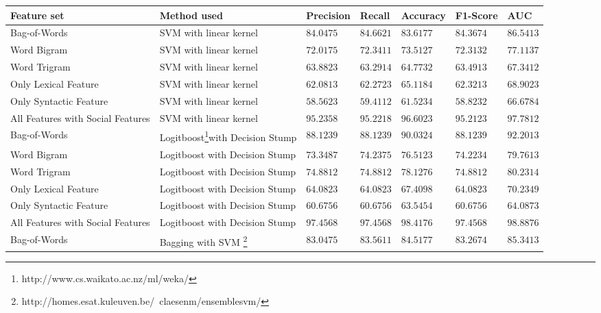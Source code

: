 \begin{table*}[htb]
  \centering
  {\small
  \begin{tabular}{|@{~}l@{~~}|@{~~}l@{~}|@{~~}l@{~}|@{~~}l@{~}|@{~~}l@{~}|@{~~}l@{~}|@{~~}l@{~}|}
\hline
Feature set & Method used & Precision & Recall & Accuracy & F1-Score & AUC \\\hline
Bag-of-Words & SVM with linear kernel & $84.0475$ & $84.6621$ & $83.6177$ & $84.3674$ & $86.5413$ \\\hline
Word Bigram & SVM with linear kernel & $72.0175$ & $72.3411$ & $73.5127$ & $72.3132$ & $77.1137$  \\\hline
Word Trigram & SVM with linear kernel & $63.8823$ & $63.2914$ & $64.7732$ & $63.4913$  & $67.3412$  \\\hline
Only Lexical Feature & SVM with linear kernel & $62.0813$ & $62.2723$ & $65.1184$ & $62.3213$   & $68.9023$ \\\hline
Only Syntactic Feature & SVM with linear kernel & $58.5623$ & $59.4112$ & $61.5234$ & $58.8232$  & $66.6784$ \\\hline
All Features with Social Features & SVM with linear kernel & $\mathbf{95.2358}$ & $\mathbf{95.2218}$ & $\mathbf{96.6023}$ & $\mathbf{95.2123}$   & $\mathbf{97.7812}$ \\\hline
Bag-of-Words & Logitboost\footnote{http://www.cs.waikato.ac.nz/ml/weka/}with Decision Stump & $88.1239$ & $88.1239$ & $90.0324$ & $88.1239$  & $92.2013$  \\\hline
Word Bigram & Logitboost with Decision Stump & $73.3487$ & $74.2375$ & $76.5123$ & $74.2234$   & $79.7613$ \\\hline
Word Trigram & Logitboost with Decision Stump & $74.8812$ & $74.8812$ & $78.1276$ & $74.8812$   & $80.2314$ \\\hline
Only Lexical Feature & Logitboost with Decision Stump & $64.0823$ & $64.0823$ & $67.4098$ & $64.0823$  & $70.2349$  \\\hline
Only Syntactic Feature & Logitboost with Decision Stump & $60.6756$ & $60.6756$ & $63.5454$ & $60.6756$  & $64.0873$ \\\hline
All Features with Social Features & Logitboost with Decision Stump & $\mathbf{97.4568}$ & $\mathbf{97.4568}$ & $\mathbf{98.4176}$ & $\mathbf{97.4568}$ & $\mathbf{98.8876}$ \\\hline
Bag-of-Words & Bagging with SVM \footnote{http://homes.esat.kuleuven.be/~claesenm/ensemblesvm/}& $83.0475$ & $83.5611$ & $84.5177$ & $83.2674$ & $85.3413$ \\\hline

\end{tabular}}
\end{table*}
